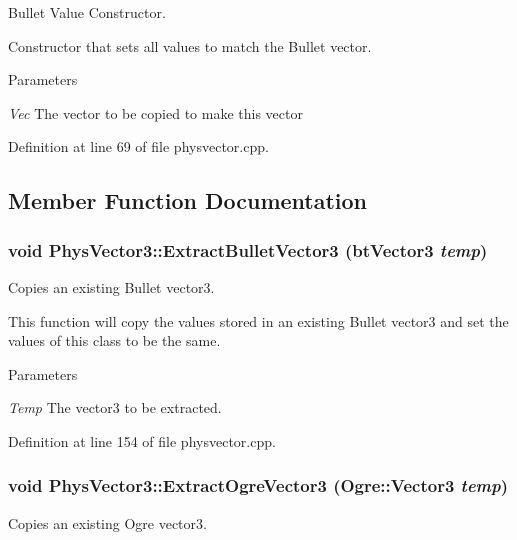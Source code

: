 Bullet Value Constructor. 

Constructor that sets all values to match the Bullet vector. 
\begin{DoxyParams}{Parameters}
\item[{\em Vec}]The vector to be copied to make this vector \end{DoxyParams}


Definition at line 69 of file physvector.cpp.



\subsection{Member Function Documentation}
\hypertarget{classPhysVector3_a71a78da9e8011cb727010f8ba3acf546}{
\subsubsection[{ExtractBulletVector3}]{\setlength{\rightskip}{0pt plus 5cm}void PhysVector3::ExtractBulletVector3 (btVector3 {\em temp})}}
\label{da/d11/classPhysVector3_a71a78da9e8011cb727010f8ba3acf546}


Copies an existing Bullet vector3. 

This function will copy the values stored in an existing Bullet vector3 and set the values of this class to be the same. 
\begin{DoxyParams}{Parameters}
\item[{\em Temp}]The vector3 to be extracted. \end{DoxyParams}


Definition at line 154 of file physvector.cpp.

\hypertarget{classPhysVector3_a422acbc95f72d00a26cb477ab7db5e87}{
\subsubsection[{ExtractOgreVector3}]{\setlength{\rightskip}{0pt plus 5cm}void PhysVector3::ExtractOgreVector3 (Ogre::Vector3 {\em temp})}}
\label{da/d11/classPhysVector3_a422acbc95f72d00a26cb477ab7db5e87}


Copies an existing Ogre vector3. 

